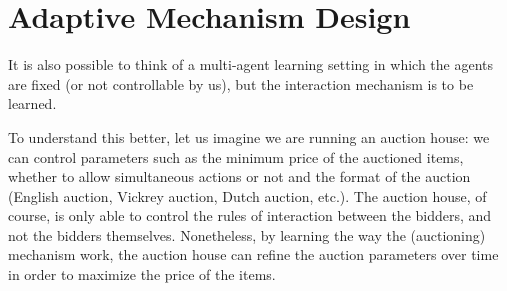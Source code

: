 \section{Adaptive Mechanism Design}
It is also possible to think of a multi-agent learning setting in which the agents are fixed (or not controllable by us), but the interaction mechanism is to be learned.

To understand this better, let us imagine we are running an auction house: we can control parameters such as the minimum price of the auctioned items, whether to allow simultaneous actions or not and the format of the auction (English auction, Vickrey auction, Dutch auction, etc.). The auction house, of course, is only able to control the rules of interaction between the bidders, and not the bidders themselves. Nonetheless, by learning the way the (auctioning) mechanism work, the auction house can refine the auction parameters over time in order to maximize the price of the items.